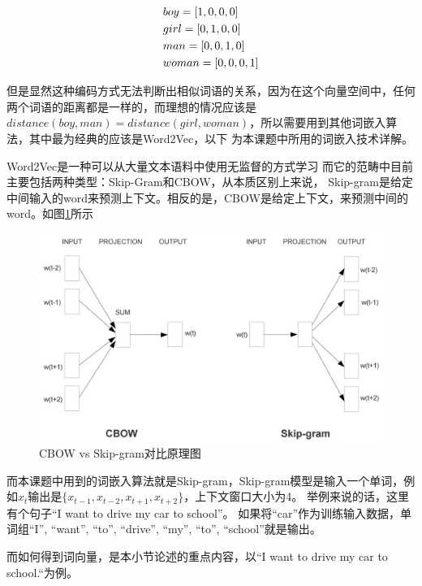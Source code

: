 \documentclass[supercite]{HustGraduPaper}
\theoremstyle{definition}
\begin{document}
\begin{align}
  &boy = [1,0,0,0]\notag\\
  &girl = [0,1,0,0]\notag\\
  &man = [0,0,1,0]\notag\\
  &woman = [0,0,0,1]\notag
\end{align}


但是显然这种编码方式无法判断出相似词语的关系，因为在这个向量空间中，任何两个词语的距离都是一样的，而理想的情况应该是
$distance(boy, man) = distance(girl, woman)$，所以需要用到其他词嵌入算法，其中最为经典的应该是Word2Vec，以下
为本课题中所用的词嵌入技术详解。

Word2Vec是一种可以从大量文本语料中使用无监督的方式学习
而它的范畴中目前主要包括两种类型：Skip-Gram\cite{guthrie2006closer}和CBOW，从本质区别上来说，
Skip-gram是给定中间输入的word来预测上下文。相反的是，CBOW是给定上下文，来预测中间的word。如图\ref{Fig.word2vec}所示

\begin{figure}[htbp] %
  \centering %
  \includegraphics[width=1\textwidth]{images/word2vec.jpg} %
  \caption{CBOW vs Skip-gram对比原理图} %
  \label{Fig.word2vec} %
\end{figure}

而本课题中用到的词嵌入算法就是Skip-gram，Skip-gram模型是输入一个单词，例如$x_t$输出是$\{x_{t-1},x_{t-2},x_{t+1},x_{t+2}\}$，上下文窗口大小为4。
举例来说的话，这里有个句子“I want to drive my car to school”。
如果将“car”作为训练输入数据，单词组{“I”, “want”, “to”, “drive”, “my”, “to”, “school”}就是输出。

而如何得到词向量，是本小节论述的重点内容，以“I want to drive my car to school.“为例。
\end{document}
